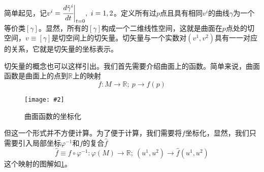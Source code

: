 \documentclass[a4paper,11pt]{ctexart}
\newcommand{\beq}{\begin{equation}}
\newcommand{\eeq}{\end{equation}}
\newcommand{\reals}{\mathbb{R}}
\newcommand{\cpic}[2]{
\begin{center}
\texttt{[image: \#2]}
\end{center}
}
\newcommand{\cpicn}[3]
{
\begin{figure}[h!]
\cpic{#1}{#2}
\caption{#3\label{#2}}
\end{figure}
}
\begin{document}
\par
简单起见，记$v^i = \cfrac{d\hat{\gamma}^i}{dt}\bigg|_{t=0},\ i = 1,2$。定义所有过$p$点且具有相同$v^i$的曲线$\gamma$为一个等价类$[\gamma]$。显然，所有的$[\gamma]$构成一个二维线性空间，这就是曲面在$p$点处的切空间，$v \equiv [\gamma]$是切空间上的切矢量。切矢量与一个实数对$(v^1,v^2)$具有一一对应的关系，它就是切矢量的坐标表示。
\par
切矢量的概念也可以这样引出。我们首先需要介绍曲面上的函数。简单来说，曲面函数是曲面上的点到$\reals$上的映射
\beq
f: M \rightarrow \reals;\ p \to f(p) 
\eeq
\cpicn{0.12}{coorfunc}{曲面函数的坐标化}
但这一个形式并不方便计算。为了便于计算，我们需要将$f$坐标化，显然，我们只需要引入局部坐标$\varphi^{-1}$和$f$的复合$\hat{f}$
\beq
\hat{f} \equiv f \circ \varphi^{-1} : \varphi(M) \to \reals;\ (u^1,u^2) \to \hat{f}(u^1,u^2)
\eeq
这个映射的图解如\cref{coorfunc}。
\end{document}
